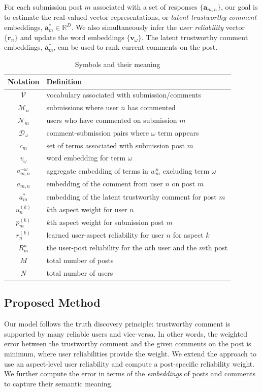 For each submission post $m$ associated with a set of responses $\{ \bm{a}_{m,n} \}$, our goal is to estimate the real-valued vector representations, or \emph{latent trustworthy comment} embeddings, $\bm{a}_m^* \in \mathbb{R}^D$. We also simultaneously infer the \emph{user reliability} vector $\{\bm{r}_n\}$ and update the word embeddings $\{\bm{v}_{\omega}\}$. The latent trustworthy comment embeddings, $\bm{a}_m^*$, can be used to rank current comments on the post.

\begin{table}[tbh]
  \centering
\begin{tabular}{c l} \toprule
Notation              & Definition \\
\midrule
$\mathcal{V}$ &  vocabulary associated with submission/comments \\
$\mathcal{M}_n$ & submissions where user $n$ has commented \\
$\mathcal{N}_m$ &  users who have commented on submission $m$ \\
$\mathcal{D}_{\omega}$ &  comment-submission pairs where $\omega$ term appears \\
$c_m$       & set of terms associated with submission post $m$ \\
$v_{\omega}$    & word embedding for term $\omega$\\
$a_{m, n}^{-\omega}$    & aggregate embedding of terms in $w_m^n$ excluding term $\omega$\\
$a_{m, n}$    & embedding of the comment from user $n$ on post $m$\\
$a_{m}^{*}$    & embedding of the latent trustworthy comment for post $m$\\
$u_{n}^{(k)} $     & $k$th aspect weight for user $n$ \\
$p_{m}^{(k)} $     & $k$th aspect weight for submission post $m$ \\
$r_n^{(k)}$   & learned user-aspect reliability for user $n$ for aspect $k$\\
$R_m^n$     & the user-post reliability for the $n$th user and the $m$th post \\
$M$     & total number of posts \\
$N$     & total number of users \\
\bottomrule
\end{tabular}
\caption{Symbols and their meaning}
\label{tab:symbols}
\end{table}

\subsection{Proposed Method}
Our model follows the truth discovery principle: trustworthy comment is supported by many reliable users and vice-versa. In other words, the weighted error between the trustworthy comment and the given comments on the post is minimum, where user reliabilities provide the weight. We extend the approach to use an aspect-level user reliability and compute a post-specific reliability weight.
We further compute the error in terms of the \textit{embeddings} of posts and comments to capture their semantic meaning.

